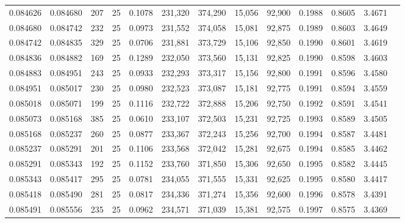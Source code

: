 \begin{tabular}{rrrrrrrrrrrrr}
0.084626 & 0.084680 &   207 &  25 &                                     0.1078 & 231,320 & 374,290 &  15,056 &  92,900 & 0.1988 & 0.8605 & 3.4671 \\
0.084680 & 0.084742 &   232 &  25 &                                     0.0973 & 231,552 & 374,058 &  15,081 &  92,875 & 0.1989 & 0.8603 & 3.4649 \\
0.084742 & 0.084835 &   329 &  25 &                                     0.0706 & 231,881 & 373,729 &  15,106 &  92,850 & 0.1990 & 0.8601 & 3.4619 \\
0.084836 & 0.084882 &   169 &  25 &                                     0.1289 & 232,050 & 373,560 &  15,131 &  92,825 & 0.1990 & 0.8598 & 3.4603 \\
0.084883 & 0.084951 &   243 &  25 &                                     0.0933 & 232,293 & 373,317 &  15,156 &  92,800 & 0.1991 & 0.8596 & 3.4580 \\
0.084951 & 0.085017 &   230 &  25 &                                     0.0980 & 232,523 & 373,087 &  15,181 &  92,775 & 0.1991 & 0.8594 & 3.4559 \\
0.085018 & 0.085071 &   199 &  25 &                                     0.1116 & 232,722 & 372,888 &  15,206 &  92,750 & 0.1992 & 0.8591 & 3.4541 \\
0.085073 & 0.085168 &   385 &  25 &                                     0.0610 & 233,107 & 372,503 &  15,231 &  92,725 & 0.1993 & 0.8589 & 3.4505 \\
0.085168 & 0.085237 &   260 &  25 &                                     0.0877 & 233,367 & 372,243 &  15,256 &  92,700 & 0.1994 & 0.8587 & 3.4481 \\
0.085237 & 0.085291 &   201 &  25 &                                     0.1106 & 233,568 & 372,042 &  15,281 &  92,675 & 0.1994 & 0.8585 & 3.4462 \\
0.085291 & 0.085343 &   192 &  25 &                                     0.1152 & 233,760 & 371,850 &  15,306 &  92,650 & 0.1995 & 0.8582 & 3.4445 \\
0.085343 & 0.085417 &   295 &  25 &                                     0.0781 & 234,055 & 371,555 &  15,331 &  92,625 & 0.1995 & 0.8580 & 3.4417 \\
0.085418 & 0.085490 &   281 &  25 &                                     0.0817 & 234,336 & 371,274 &  15,356 &  92,600 & 0.1996 & 0.8578 & 3.4391 \\
0.085491 & 0.085556 &   235 &  25 &                                     0.0962 & 234,571 & 371,039 &  15,381 &  92,575 & 0.1997 & 0.8575 & 3.4369 \\

\end{tabular}
